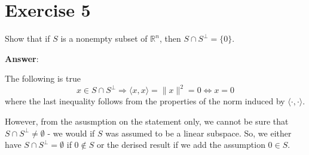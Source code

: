 \documentclass[11pt,twoside,fleqn,reqno,a4paper]{amsart}
\numberwithin{equation}{section}
\begin{document}
\section*{Exercise 5}
\setcounter{section}{3}
\begin{em}
Show that if $S$ is a nonempty subset of $\mathbb{R}^n$, then $ S\cap S^{\bot} = \{0\}$.
\end{em}

\textbf{Answer}:

The following is true
\[  
    x\in S\cap S^{\bot} \Rightarrow \langle x,x \rangle = \lVert x\rVert^2 = 0 \Leftrightarrow x = 0  
\] 
where the last inequality follows from the properties of the norm induced by $ \langle \cdot,\cdot \rangle $.

However, from the asusmption on the statement only, we cannot be sure that $S\cap S^{\bot} \ne \emptyset$ - we would if $ S$
was assumed to be a linear subspace. So, we either have $ S\cap S^{\bot} = \emptyset $ if $ 0 \not\in S $
or the derised result if we add the assumption $0\in S$.

 {} 
\end{document}
